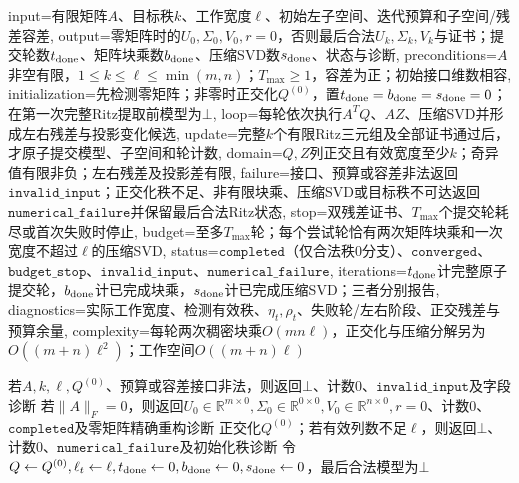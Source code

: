 \begin{AlgorithmContract}{
  input={有限矩阵$A$、目标秩$k$、工作宽度$\ell$、初始左子空间、迭代预算和子空间/残差容差},
  output={零矩阵时的$U_0,\Sigma_0,V_0,r=0$，否则最后合法$U_k,\Sigma_k,V_k$与证书；提交轮数$t_{\rm done}$、矩阵块乘数$b_{\rm done}$、压缩SVD数$s_{\rm done}$、状态与诊断},
  preconditions={$A$非空有限，$1\le k\le\ell\le\min(m,n)$；$T_{\max}\ge1$，容差为正；初始接口维数相容},
  initialization={先检测零矩阵；非零时正交化$Q^{(0)}$，置$t_{\rm done}=b_{\rm done}=s_{\rm done}=0$；在第一次完整Ritz提取前模型为$\bot$},
  loop={每轮依次执行$A^TQ$、$AZ$、压缩SVD并形成左右残差与投影变化候选},
  update={完整$k$个有限Ritz三元组及全部证书通过后，才原子提交模型、子空间和轮计数},
  domain={$Q,Z$列正交且有效宽度至少$k$；奇异值有限非负；左右残差及投影差有限},
  failure={接口、预算或容差非法返回$\mathtt{invalid\_input}$；正交化秩不足、非有限块乘、压缩SVD或目标秩不可达返回$\mathtt{numerical\_failure}$并保留最后合法Ritz状态},
  stop={双残差证书、$T_{\max}$个提交轮耗尽或首次失败时停止},
  budget={至多$T_{\max}$轮；每个尝试轮恰有两次矩阵块乘和一次宽度不超过$\ell$的压缩SVD},
  status={$\mathtt{completed}$（仅合法秩$0$分支）、$\mathtt{converged}$、$\mathtt{budget\_stop}$、$\mathtt{invalid\_input}$、$\mathtt{numerical\_failure}$},
  iterations={$t_{\rm done}$计完整原子提交轮，$b_{\rm done}$计已完成块乘，$s_{\rm done}$计已完成压缩SVD；三者分别报告},
  diagnostics={实际工作宽度、检测有效秩、$\eta_t,\rho_t$、失败轮/左右阶段、正交残差与预算余量},
  complexity={每轮两次稠密块乘$O(mn\ell)$，正交化与压缩分解另为$O((m+n)\ell^2)$；工作空间$O((m+n)\ell)$}
}
\begin{algorithm}[!t]
\caption{截断SVD的双边子空间迭代}\label{alg:V4-C03-subspace-svd}
若$A,k,\ell,Q^{(0)}$、预算或容差接口非法，则返回$\bot$、计数$0$、$\mathtt{invalid\_input}$及字段诊断\;
若$\|A\|_F=0$，则返回$U_0\in\mathbb R^{m\times0},\Sigma_0\in\mathbb R^{0\times0},V_0\in\mathbb R^{n\times0},r=0$、计数$0$、$\mathtt{completed}$及零矩阵精确重构诊断\;
正交化$Q^{(0)}$；若有效列数不足$\ell$，则返回$\bot$、计数$0$、$\mathtt{numerical\_failure}$及初始化秩诊断\;
令$Q\leftarrow Q^{(0)},\ell_t\leftarrow\ell,t_{\rm done}\leftarrow0,b_{\rm done}\leftarrow0,s_{\rm done}\leftarrow0$，最后合法模型为$\bot$\;
\end{algorithm}
\end{AlgorithmContract}
